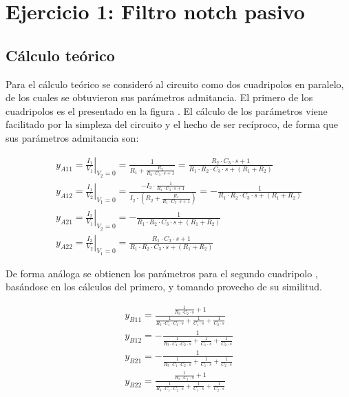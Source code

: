 

\section{Ejercicio 1: Filtro notch pasivo}
\subsection{C\'alculo te\'orico}
Para el c\'alculo te\'orico se consider\'o al circuito como dos cuadripolos en paralelo, de los cuales se obtuvieron sus par\'ametros admitancia.
El primero de los cuadripolos es el presentado en la figura .
El c\'alculo de los par\'ametros viene facilitado por la simpleza del circuito y el hecho de ser rec\'iproco, de forma que sus par\'ametros admitancia son:

\begin{align}
    \label{eqn: Admittance parameters first quadrupole.}
    y_{A11} = \left. \frac{I_1}{V_1} \right\rvert_{V_2=0} = \frac{1}{R_1 + \frac{R_2}{R_2 \cdot C_3 \cdot s + 1}} = \frac{R_2 \cdot C_3 \cdot s + 1}{R_1 \cdot R_2 \cdot C_3 \cdot s + \left(R_1+R_2\right)} \\
    y_{A12} = \left. \frac{I_1}{V_2} \right\rvert_{V_1=0} = \frac{-I_2 \cdot \frac{1}{R_1 \cdot C_3 \cdot s + 1}}{I_2 \cdot \left(R_2 + \frac{R_1}{R_1 \cdot C_3 \cdot s + 1}\right)} = -\frac{1}{R_1 \cdot R_2 \cdot C_3 \cdot s + \left(R_1+R_2\right)}\\
    y_{A21} = \left. \frac{I_2}{V_1} \right\rvert_{V_2=0} = -\frac{1}{R_1 \cdot R_2 \cdot C_3 \cdot s + \left(R_1+R_2\right)}\\
    y_{A22} = \left. \frac{I_2}{V_2} \right\rvert_{V_1=0} = \frac{R_1 \cdot C_3 \cdot s + 1}{R_1 \cdot R_2 \cdot C_3 \cdot s + \left(R_1+R_2\right)}
\end{align}

De forma an\'aloga se obtienen los par\'ametros para el segundo cuadripolo , bas\'andose en los c\'alculos del primero, y tomando provecho de su similitud.

\begin{align}
    \label{eqn: Admittance parameters second quadrupole.}
    y_{B11} = \frac{\frac{1}{R_3 \cdot C_2 \cdot s} + 1}{\frac{1}{R_3 \cdot C_1 \cdot C_2 \cdot s} + \frac{1}{C_1 \cdot s} + \frac{1}{C_2 \cdot s}} \\
    y_{B12} = -\frac{1}{\frac{1}{R_3 \cdot C_1 \cdot C_2 \cdot s} + \frac{1}{C_1 \cdot s} + \frac{1}{C_2 \cdot s}}\\
    y_{B21} = -\frac{1}{\frac{1}{R_3 \cdot C_1 \cdot C_2 \cdot s} + \frac{1}{C_1 \cdot s} + \frac{1}{C_2 \cdot s}}\\
    y_{B22} = \frac{\frac{1}{R_3 \cdot C_1 \cdot s} + 1}{\frac{1}{R_3 \cdot C_1 \cdot C_2 \cdot s} + \frac{1}{C_1 \cdot s} + \frac{1}{C_2 \cdot s}}
\end{align}

